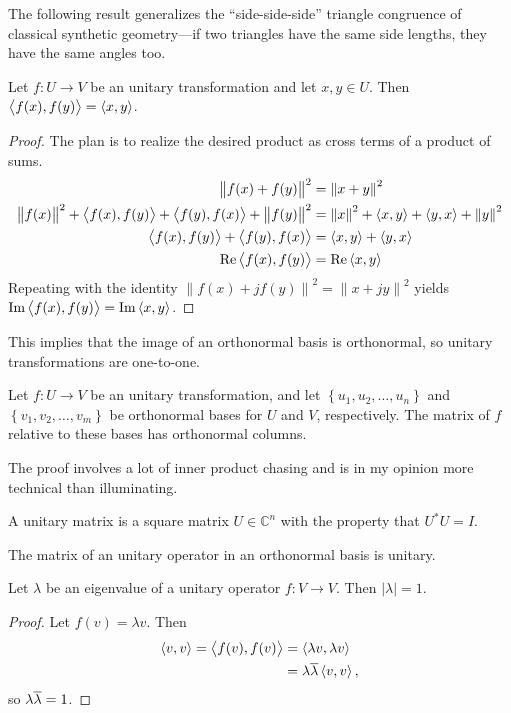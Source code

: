 The following result generalizes the ``side-side-side'' triangle congruence of classical synthetic geometry---if two triangles have the same side lengths, they have the same angles too.
\begin{theorem}
  Let \(f: U\to V\) be an unitary transformation and let \(x, y \in U\).
  Then \(\left\langle f(x), f(y)\right\rangle = \left\langle x, y\right\rangle\).
\end{theorem}
\begin{proof}
  The plan is to realize the desired product as cross terms of a product of sums.
  \begin{align}
    \left\|f(x) + f(y)\right\|^2
    &= \left\|x + y\right\|^2\\
    \left\|f(x)\right\|^2 + \left\langle f(x), f(y)\right\rangle + \left\langle f(y), f(x)\right\rangle
    + \left\|f(y)\right\|^2
    &=
    \left\|x\right\|^2 + \left\langle x, y\right\rangle + \left\langle y, x\right\rangle
    + \left\|y\right\|^2 \\
    \left\langle f(x), f(y)\right\rangle + \left\langle f(y), f(x)\right\rangle
    &=
    \left\langle x, y\right\rangle + \left\langle y, x\right\rangle\\
    \Re\left\langle f(x), f(y)\right\rangle
    &=
    \Re\left\langle x, y\right\rangle
  \end{align}
  Repeating with the identity
  \(\left\|f(x) + jf(y)\right\|^2
  = \left\|x + jy\right\|^2\) yields
  \(\Im\left\langle f(x), f(y)\right\rangle
  =
  \Im\left\langle x, y\right\rangle\).
\end{proof}
This implies that the image of an orthonormal basis is orthonormal, so unitary transformations are one-to-one.


\begin{theorem}
  Let \(f: U\to V\) be an unitary transformation, and let
  \(\left\{u_1, u_2, \ldots, u_n\right\}\) and
  \(\left\{v_1, v_2, \ldots, v_m\right\}\) be orthonormal bases for \(U\) and \(V\), respectively.
  The matrix of \(f\) relative to these bases has orthonormal columns.
\end{theorem}
The proof involves a lot of inner product chasing and is in my opinion more technical than illuminating.

\begin{definition}
  A unitary matrix is a square matrix \(U \in \mathbb{C}^n\) with the property that \(U^*U = I\).
\end{definition}
The matrix of an unitary operator in an orthonormal basis is unitary.

\begin{theorem}
  Let \(\lambda\) be an eigenvalue of a unitary operator \(f: V\to V\).
  Then \(\left|\lambda \right| =1\).
\end{theorem}
\begin{proof}
  Let \(f(v) = \lambda v\).
  Then \begin{align}
    \left\langle v, v\right\rangle = \left\langle f(v), f(v)\right\rangle
    & = \left\langle\lambda v, \lambda v\right\rangle\\
    &= \lambda \overline{\lambda}\left\langle v, v\right\rangle,
\end{align}
so \(\lambda \overline{\lambda} = 1\).
\end{proof}
